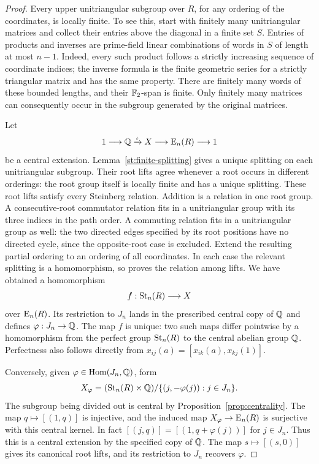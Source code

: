 \begin{proof}
Every upper unitriangular subgroup over $R$, for any ordering of
the coordinates, is locally finite. To see this, start with
finitely many unitriangular matrices and collect their entries
above the diagonal in a finite set $S$. Entries of products and
inverses are prime-field linear combinations of words in $S$
of length at most $n-1$. Indeed, every such product follows a
strictly increasing sequence of coordinate indices; the inverse
formula is the finite geometric series for a strictly triangular
matrix and has the same property. There are finitely many words
of these bounded lengths, and their $\mathbb F_2$-span is finite.
Only finitely many matrices can consequently occur in the
subgroup generated by the original matrices.

Let
\[
 1\longrightarrow\mathbb Q\xrightarrow{\iota}X
 \longrightarrow\operatorname{E}_n(R)\longrightarrow1
\]
be a central extension. Lemma~\ref{st:finite-splitting} gives a
unique splitting on each unitriangular subgroup. Their root
lifts agree whenever a root occurs in different orderings: the
root group itself is locally finite and has a unique splitting.
These root lifts satisfy every Steinberg relation. Addition is
a relation in one root group. A consecutive-root commutator
relation fits in a unitriangular group with its three indices
in the path order. A commuting relation fits in a unitriangular
group as well: the two directed edges specified by its root
positions have no directed cycle, since the opposite-root case
is excluded. Extend the resulting partial ordering to an
ordering of all coordinates. In each case the relevant
splitting is a homomorphism, so proves the relation among lifts.
We have obtained a homomorphism
\[
 f:\operatorname{St}_n(R)\longrightarrow X
\]
over $\operatorname{E}_n(R)$. Its restriction to $J_n$ lands in the prescribed
central copy of $\mathbb Q$ and defines $\varphi:J_n\to\mathbb Q$.
The map $f$ is unique: two such maps differ pointwise by a
homomorphism from the perfect group $\operatorname{St}_n(R)$ to the central
abelian group $\mathbb Q$. Perfectness also follows directly from
$x_{ij}(a)=[x_{ik}(a),x_{kj}(1)]$.

Conversely, given $\varphi\in\operatorname{Hom}(J_n,\mathbb Q)$, form
\[
 X_\varphi=
 (\operatorname{St}_n(R)\times\mathbb Q)/
 \{(j,-\varphi(j)):j\in J_n\}.
\]
The subgroup being divided out is central by
Proposition~\ref{prop:centrality}. The map $q\mapsto[(1,q)]$
is injective, and the induced map $X_\varphi\to\operatorname{E}_n(R)$
is surjective with this central kernel. In fact
$[(j,q)]=[(1,q+\varphi(j))]$ for $j\in J_n$.
Thus this is a central extension by the specified copy of
$\mathbb Q$. The map $s\mapsto[(s,0)]$ gives its canonical root
lifts, and its restriction to $J_n$ recovers $\varphi$.


\end{proof}
